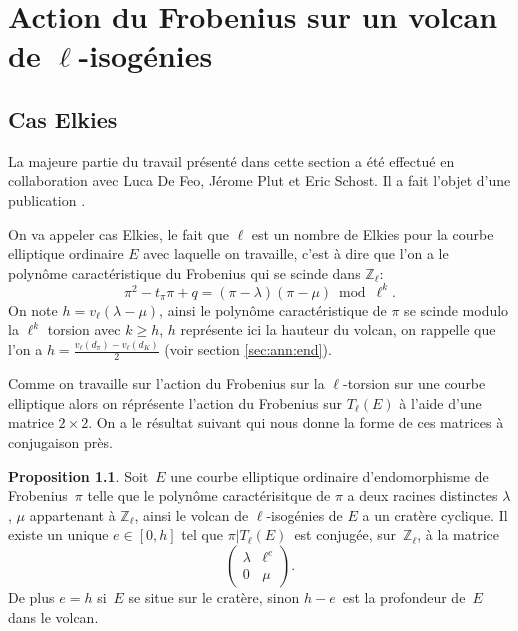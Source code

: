 \documentclass[10pt,a4paper]{book}
\theoremstyle{plain}
\theoremstyle{definition}
\theoremstyle{definition}
\theoremstyle{definition}
\newtheorem{prop}[thm]{Proposition}
\theoremstyle{definition}
\theoremstyle{remark}
\theoremstyle{remark}
\theoremstyle{definition}
\begin{document}
\chapter{Action du Frobenius sur un volcan de $\ell$-isogénies}
\label{cha:act:fro}
\section{Cas Elkies}
La majeure partie du travail présenté dans cette section a été effectué en collaboration avec Luca De Feo, Jérome Plut et Eric Schost. Il a fait l'objet d'une publication \cite{Defeo_Plut_Schost_2016}.


On va appeler cas Elkies, le fait que $\ell$ est un nombre de Elkies pour la courbe elliptique ordinaire $E$ avec laquelle on travaille, c'est à dire que l'on a le polynôme caractéristique du Frobenius qui se scinde dans  $\mathbb{Z}_{\ell}$:
\begin{equation*}
\pi^2 - t_{\pi}\pi + q = (\pi - \lambda)(\pi - \mu) \bmod \ell^k.
\end{equation*}
On note $h=v_{\ell}(\lambda - \mu)$, ainsi le polynôme caractéristique de $\pi$ se scinde modulo la $\ell^k$ torsion avec $k \geqslant h$, $h$ représente ici la hauteur du volcan, on rappelle que l'on a $h=\frac{v_{\ell}(d_{\pi})-v_{\ell}(d_K)}{2}$ (voir section \ref{sec:ann:end}).

Comme on travaille sur l'action du Frobenius sur la $\ell$-torsion sur une courbe elliptique alors on réprésente l'action du Frobenius sur $T_{\ell}(E)$ à l'aide d'une matrice $2 \times 2$. On a le résultat suivant qui nous donne la forme de ces matrices à conjugaison près.


\begin{prop}\label{pro:mat:fro}
Soit~$E$ une courbe elliptique ordinaire d'endomorphisme de Frobenius~$\pi$
telle que le polynôme caractérisitque de $\pi$
a deux racines distinctes $\lambda$, $\mu$ appartenant à $\mathbb{Z}_{\ell}$,
ainsi le volcan de $\ell$-isogénies de $E$ a un cratère cyclique.
Il existe un unique $e \in [ 0, h]$
tel que $\pi|T_{\ell}(E)$~est conjugée, sur~$\mathbb{Z}_{\ell}$,
à la matrice 
\begin{equation*}
\left ( \begin{matrix}\lambda & \ell^e \\ 0 & \mu
\end{matrix}\right ).
\end{equation*}
De plus $e = h$ si~$E$ se situe sur le cratère,
sinon $h - e$~est la profondeur de~$E$ dans le volcan.
\end{prop}
\end{document}

